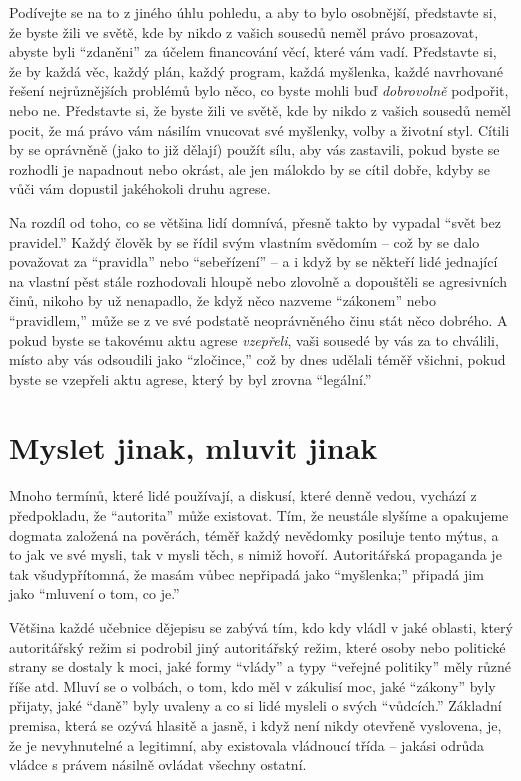 \documentclass{book}
\begin{document}
Podívejte se na to z jiného úhlu pohledu, a aby to bylo osobnější, představte si, že byste žili ve světě, kde by nikdo z vašich sousedů neměl právo prosazovat, abyste byli \enquote{zdaněni} za účelem financování věcí, které vám vadí. Představte si, že by každá věc, každý plán, každý program, každá myšlenka, každé navrhované řešení nejrůznějších problémů bylo něco, co byste mohli buď \emph{dobrovolně} podpořit, nebo ne. Představte si, že byste žili ve světě, kde by nikdo z vašich sousedů neměl pocit, že má právo vám násilím vnucovat své myšlenky, volby a životní styl. Cítili by se oprávněně (jako to již dělají) použít sílu, aby vás zastavili, pokud byste se rozhodli je napadnout nebo okrást, ale jen málokdo by se cítil dobře, kdyby se vůči vám dopustil jakéhokoli druhu agrese.

Na rozdíl od toho, co se většina lidí domnívá, přesně takto by vypadal \enquote{svět bez pravidel.} Každý člověk by se řídil svým vlastním svědomím -- což by se dalo považovat za \enquote{pravidla} nebo \enquote{sebeřízení} -- a i když by se někteří lidé jednající na vlastní pěst stále rozhodovali hloupě nebo zlovolně a dopouštěli se agresivních činů, nikoho by už nenapadlo, že když něco nazveme \enquote{zákonem} nebo \enquote{pravidlem,} může se z ve své podstatě neoprávněného činu stát něco dobrého. A pokud byste se takovému aktu agrese \emph{vzepřeli}, vaši sousedé by vás za to chválili, místo aby vás odsoudili jako \enquote{zločince,} což by dnes udělali téměř všichni, pokud byste se vzepřeli aktu agrese, který by byl zrovna \enquote{legální.}

\section{Myslet jinak, mluvit jinak}

Mnoho termínů, které lidé používají, a diskusí, které denně vedou, vychází z předpokladu, že \enquote{autorita} může existovat. Tím, že neustále slyšíme a opakujeme dogmata založená na pověrách, téměř každý nevědomky posiluje tento mýtus, a to jak ve své mysli, tak v mysli těch, s nimiž hovoří. Autoritářská propaganda je tak všudypřítomná, že masám vůbec nepřipadá jako \enquote{myšlenka;} připadá jim jako \enquote{mluvení o tom, co je.}

Většina každé učebnice dějepisu se zabývá tím, kdo kdy vládl v jaké oblasti, který autoritářský režim si podrobil jiný autoritářský režim, které osoby nebo politické strany se dostaly k moci, jaké formy \enquote{vlády} a typy \enquote{veřejné politiky} měly různé říše atd. Mluví se o volbách, o tom, kdo měl v zákulisí moc, jaké \enquote{zákony} byly přijaty, jaké \enquote{daně} byly uvaleny a co si lidé mysleli o svých \enquote{vůdcích.} Základní premisa, která se ozývá hlasitě a jasně, i když není nikdy otevřeně vyslovena, je, že je nevyhnutelné a legitimní, aby existovala vládnoucí třída -- jakási odrůda vládce s právem násilně ovládat všechny ostatní.
\end{document}
